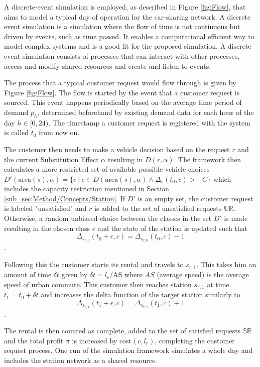 A discrete-event simulation is employed, as described in Figure \ref{fig:Flow}, that aims to model a typical day of operation
for the car-sharing network. A discrete event simulation is a simulation where the flow of time is not continuous but driven
by events, such as time passed. It enables a computational efficient way to model complex systems and is a good fit for the
proposed simulation. A discrete event simulation consists of processes that can interact with other processes, access and modify
shared resources and create and listen to events.

The process that a typical customer request would flow through is given by Figure \ref{fig:Flow}. The flow is started by the
event that a customer request is sourced. This event happens periodically based on the average time period of demand $p_h$, determined
beforehand by existing demand data for each hour of the day $h \in [0,24)$. The timestamp a customer request is registered with the system
is called $t_0$ from now on.

The customer then needs to make a vehicle decision based on the request $r$ and the current Substitution Effect
 $\alpha$ resulting in $D(r, \alpha)$. The framework then calculates a more restricted set of available
possible vehicle choices $D'(\text{area}(s), \alpha) = \{c \ |\ c \in D(\text{area}(s), \alpha) \land \Delta_s(t_0, c) > -C\}$ which
includes the capacity restriction mentioned in Section \ref{sub_sec:Method/Concepts/Station}. If $D'$ is an empty set, the customer
request is labeled "unsatisfied" and $r$ is added to the set of unsatisfied requests $\mathbb{UR}$. Otherwise, a random unbiased choice between the classes in 
the set $D'$ is made resulting in the chosen class $c$ and the state of the station is updated such that 
$$
\Delta_{s_{r, 0}}(t_0 + \epsilon, c) = \Delta_{s_{r, 0}}(t_0, c) - 1
$$.
 
Following this the customer starts its rental and travels to $s_{r, 1}$. This takes him an amount of time $\delta t$ given by 
$\delta t = l_r / \text{AS}$ where $AS$ (average speed) is the average speed of urban commute. This customer then reaches
station $s_{r, 1}$ at time $t_1 = t_0 + \delta t$ and increases the delta function of the target station similarly to
$$
\Delta_{s_{r, 1}}(t_1 + \epsilon, c) = \Delta_{s_{r, 1}}(t_1, c) + 1
$$.

The rental is then counted as complete, added to the set of satisfied requests $\mathbb{SR}$ and the total profit $\pi$ is increased by $\text{cost}(c, l_r)$, completing the
customer request process. One run of the simulation framework simulates a whole day and includes the station network
as a shared resource.



